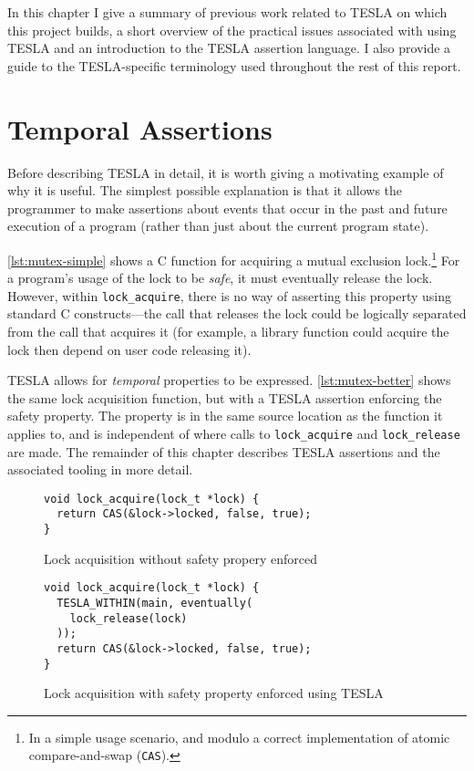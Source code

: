 In this chapter I give a summary of previous work related to TESLA on which this
project builds, a short overview of the practical issues associated with using
TESLA and an introduction to the TESLA assertion language. I also provide a
guide to the TESLA-specific terminology used throughout the rest of this report.

\section{Temporal Assertions}

Before describing TESLA in detail, it is worth giving a motivating example of
why it is useful. The simplest possible explanation is that it allows the
programmer to make assertions about events that occur in the past and future
execution of a program (rather than just about the current program state).

\autoref{lst:mutex-simple} shows a C function for acquiring a mutual exclusion
lock.\footnote{In a simple usage scenario, and modulo a correct implementation
of atomic compare-and-swap (\texttt{CAS}).} For a program's usage of the
lock to be \emph{safe}, it must eventually release the lock. However, within
\texttt{lock_acquire}, there is no way of asserting this property using
standard C constructs---the call that releases the lock could be logically
separated from the call that acquires it (for example, a library function could
acquire the lock then depend on user code releasing it).

TESLA allows for \emph{temporal} properties to be expressed.
\autoref{lst:mutex-better} shows the same lock acquisition function, but with a
TESLA assertion enforcing the safety property. The property is in the same
source location as the function it applies to, and is independent of where calls
to \texttt{lock_acquire} and \texttt{lock_release} are made. The
remainder of this chapter describes TESLA assertions and the associated tooling
in more detail.

\begin{figure}
  \begin{verbatim}
void lock_acquire(lock_t *lock) {
  return CAS(&lock->locked, false, true);
}
  \end{verbatim}
  \caption{Lock acquisition without safety propery enforced}
  \label{lst:mutex-simple}
\end{figure}

\begin{figure}
  \begin{verbatim}
void lock_acquire(lock_t *lock) {
  TESLA_WITHIN(main, eventually(
    lock_release(lock)
  ));
  return CAS(&lock->locked, false, true);
}
  \end{verbatim}
  \caption{Lock acquisition with safety property enforced using TESLA}
  \label{lst:mutex-better}
\end{figure}

